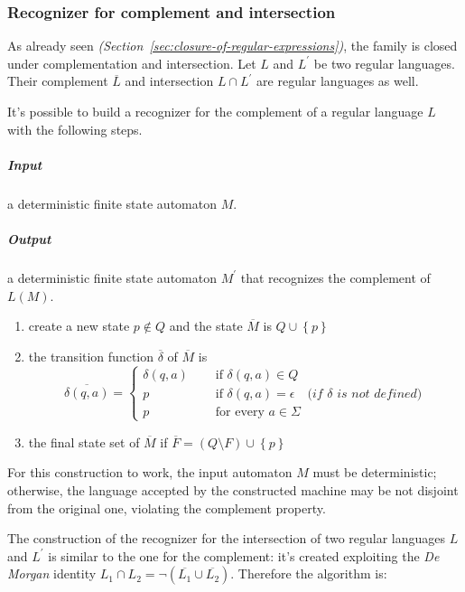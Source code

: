 \documentclass[english]{article}
\begin{document}
\subsubsection{Recognizer for complement and intersection}

As already seen \textit{(Section~\ref{sec:closure-of-regular-expressions})}, the \REG family is closed under complementation and intersection.
Let \(L\) and \(L^\prime\) be two regular languages. Their complement \(\overline{L}\) and intersection \(L \cap L^\prime\) are regular languages as well.

It's possible to build a recognizer for the complement of a regular language \(L\) with the following steps.

\bigskip
\subparagraph*{Input}
a deterministic finite state automaton \(M\).

\subparagraph*{Output}
a deterministic finite state automaton \(M^\prime\) that recognizes the complement of \(L(M)\).

\begin{enumerate}
  \item create a new state \(p \notin Q\) and the state \(\overline{M}\) is \(Q \cup \left\{ p \right\}\)
  \item the transition function \(\overline{\delta}\) of \(\overline{M}\) is
        \[\overline{\delta(q, a)} = \begin{cases}
            \delta(q, a) \quad & \text{ if } \delta(q, a)\in Q                                                             \\
            p \quad            & \text{ if } \delta(q, a) = \epsilon \quad \textit{(if }  \delta \textit{ is not defined)} \\
            p \quad            & \text{ for every } a \in \Sigma
          \end{cases}\]
  \item the final state set of \(\overline{M}\) if \(\overline{F} = \left( Q \setminus F \right) \cup \left\{ p \right\}\)
\end{enumerate}

For this construction to work, the input automaton \(M\) must be deterministic;
otherwise, the language accepted by the constructed machine may be not disjoint from the original one, violating the complement property.

\bigskip
The construction of the recognizer for the intersection of two regular languages \(L\) and \(L^\prime\) is similar to the one for the complement:
it's created exploiting the \textit{De Morgan} identity \(L_1 \cap L_2 = \lnot (\overline{L_1} \cup \overline{L_2})\).
Therefore the algorithm is:
\end{document}
